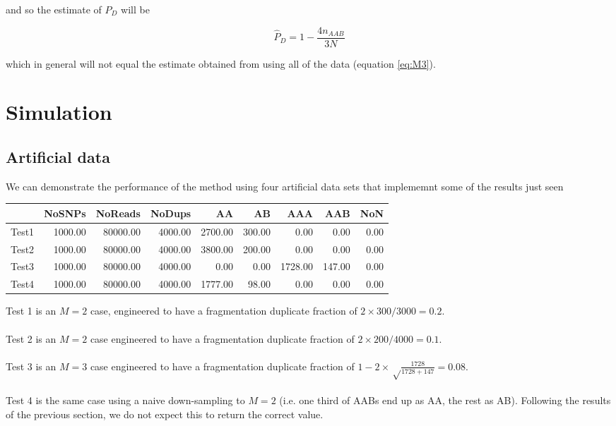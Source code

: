 \documentclass{article}
\begin{document}
and so the estimate of $P_D$ will be 

\begin{equation}
\hat{P}_D = 1 - \frac{4n_{AAB}}{3N}
\end{equation}

which in general will not equal the estimate obtained from using all of the data (equation \ref{eq:M3}).
\clearpage{}

\section{Simulation}

\subsection{Artificial data}

We can demonstrate the performance of the method using four artificial data sets that implememnt some of the results just seen

\begin{table}[ht]
\centering
\begin{tabular}{rrrrrrrrr}
  \hline
 & NoSNPs & NoReads & NoDups & AA & AB & AAA & AAB & NoN \\ 
  \hline
Test1 & 1000.00 & 80000.00 & 4000.00 & 2700.00 & 300.00 & 0.00 & 0.00 & 0.00 \\ 
  Test2 & 1000.00 & 80000.00 & 4000.00 & 3800.00 & 200.00 & 0.00 & 0.00 & 0.00 \\ 
  Test3 & 1000.00 & 80000.00 & 4000.00 & 0.00 & 0.00 & 1728.00 & 147.00 & 0.00 \\ 
  Test4 & 1000.00 & 80000.00 & 4000.00 & 1777.00 & 98.00 & 0.00 & 0.00 & 0.00 \\ 
   \hline
\end{tabular}
\end{table}

Test 1 is an $M=2$ case, engineered to have a fragmentation duplicate fraction of $2 \times 300/3000 = 0.2$. \\\\ Test 2 is an $M=2$ case engineered to have a fragmentation duplicate fraction of $2 \times 200/4000 = 0.1$. \\\\ Test 3 is an $M=3$ case engineered to have a fragmentation duplicate fraction of $1- 2 \times \sqrt \frac{1728}{1728+147} = 0.08$.\\\\ Test 4 is the same case using a naive down-sampling to $M=2$ (i.e. one third of AABs end up as AA, the rest as AB). Following the results of the previous section, we do not expect this to return the correct value.
\end{document}
